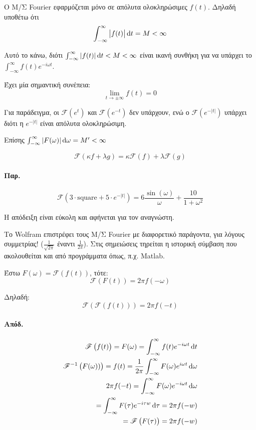 \documentclass[11pt,a4paper,titlepage,final]{article}
\begin{document}
\begin{tcolorbox}
Ο Μ/Σ \textlatin{Fourier} εφαρμόζεται μόνο σε απόλυτα ολοκληρώσιμες \(f(t)\). Δηλαδή υποθέτω ότι \[
\int_{- \infty }^ \infty 
\left|
f(t)
\right|
\dif t = M <  \infty 
\]

Αυτό το κάνω, διότι \(\int_{- \infty }^ \infty |f(t)| \dif t < M < \infty\) είναι ικανή συνθήκη για να υπάρχει το \(\int_{- \infty }^ \infty f(t)e^{-i\omega t}\).

Έχει μία σημαντική συνέπεια:
\[
\lim_{t\to\pm\infty} f(t) = 0
\]

Για παράδειγμα, οι \(\mathscr{F}(e^t)\) και \(\mathscr{F}(e^{-t})\) δεν υπάρχουν, ενώ ο \(\mathscr{F}(e^{-|t|})\) υπάρχει διότι η \(e^{-|t|}\) είναι απόλυτα ολοκληρώσιμη.

Επίσης \( \int_{-\infty}^ \infty |F(\omega)| \dif \omega = M' < \infty \)
\end{tcolorbox}

\begin{theorem}{}{}
\[
\mathscr{F}(\kappa f + \lambda g) = \kappa \mathscr{F}(f)+\lambda \mathscr{F}(g)
\]
\tcblower
\paragraph{Παρ.}
\[
 \mathscr{F} (3\cdot \mathrm{square} + 5\cdot e^{-|t|}) = 6 \frac{\sin(\omega)}{\omega}+\frac{10}{1+\omega^2}
\]
\end{theorem}
Η απόδειξη είναι εύκολη και αφήνεται για τον αναγνώστη.

\begin{attnbox}{}
Το \textlatin{Wolfram} επιστρέφει τους Μ/Σ \textlatin{Fourier} με διαφορετικό παράγοντα, για λόγους συμμετρίας! (\(\frac{1}{\sqrt{2\pi}}\) έναντι \(\frac{1}{2\pi}\)). Στις σημειώσεις τηρείται η ιστορική σύμβαση που ακολουθείται και από προγράμματα όπως, π.χ. \textlatin{Matlab}.
\end{attnbox}

\begin{theorem}{}{}
Έστω \(F( \omega )= \mathscr{F} \left( f(t) \right)\), τότε:
\[
 \mathscr{F} \left( F(t) \right) = 2\pi f(-\omega)
\]

Δηλαδή:
\[
 \mathscr{F} \left(  \mathscr{F} \left( f(t) \right) \right) = 2\pi f(-t)
\]
\end{theorem}
\paragraph{Απόδ.}
\begin{align*}
 \mathscr{F} \left( f(t) \right) = F(\omega) = \int_{-\infty}^\infty f(t)e^{-i\omega t} \dif t \\
 \mathscr{F}^{-1} \left( F(\omega)) \right) = f(t) = \frac{1}{2\pi}\int_{-\infty}^\infty F(\omega)e^{i\omega t} \dif \omega \\
 2\pi f(-t) = \int_{-\infty}^ \infty F(\omega) e^{-i\omega t} \dif \omega
 \\
= \int_{-\infty}^ \infty F(\tau)e^{-i\tau w} \dif \tau = 2\pi f(-w) \\
=  \mathscr{F} \left( F(\tau) \right) =2\pi f(-w)
\end{align*}
\end{document}
